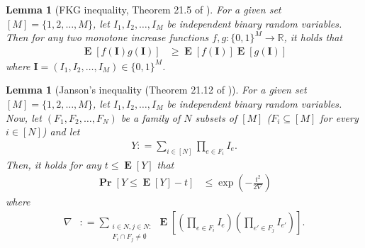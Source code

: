 \documentclass[letterpaper,11pt]{article}
\newtheorem{lemma}[theorem]{Lemma}
\newcommand{\Ind}{I}
\newcommand{\Es}{F}
\renewcommand\Pr{\mathop{\mathbf{Pr}}}
\DeclareMathOperator{\E}{\mathbf{E}}
\def\defeq{\mathrel{\mathop:}=}%
\begin{document}
\begin{lemma}[FKG inequality, Theorem 21.5 of \cite{FK16}]\label{lem:FKG}
For a given set $[M]=\{1,2, \ldots, M\}$, let $\Ind_1, \Ind_2, \ldots, \Ind_M$ be independent binary random variables.
Then for any two monotone increase functions $f,g: \{0,1\}^{M}\to \mathbb{R}$, it holds that
\begin{align*}
\E[f(\mathbf{\Ind})g(\mathbf{\Ind})]&\geq \E[f(\mathbf{\Ind})]\E[g(\mathbf{\Ind})]
\end{align*}
where $\mathbf{\Ind}=(\Ind_1, \Ind_2, \ldots, \Ind_M)\in \{0,1\}^{M}$.
\end{lemma}
%
\begin{lemma}[Janson's inequality (Theorem 21.12 of \cite{FK16})]\label{lem:Janson}
For a given set $[M]=\{1,2, \ldots, M\}$, let $\Ind_1, \Ind_2, \ldots, \Ind_M$ be independent binary random variables.
%
Now, let $(\Es_1, \Es_2, \ldots, \Es_N)$ be a family of $N$ subsets of $[M]$ ($\Es_i\subseteq [M]$ for every $i\in [N]$) and let
\begin{align*}
Y
\defeq \sum_{i\in [N]}\prod_{e\in \Es_i}\Ind_e.
\end{align*}
Then, it holds for any $t \leq \E[Y]$ that
\begin{align*}
\Pr\left[Y\leq \E[Y]-t\right]&\leq \exp\left(-\frac{t^2}{2\nabla}\right)
\end{align*}
where
\begin{align*}
\nabla&\defeq \sum_{\substack{i\in N, j\in N:\\\Es_i\cap \Es_j\neq \emptyset}}
\E\left[\left(\prod_{e\in \Es_i} \Ind_e\right)\left( \prod_{e'\in \Es_j} \Ind_{e'}\right)\right].
\end{align*}
\end{lemma}
\end{document}
